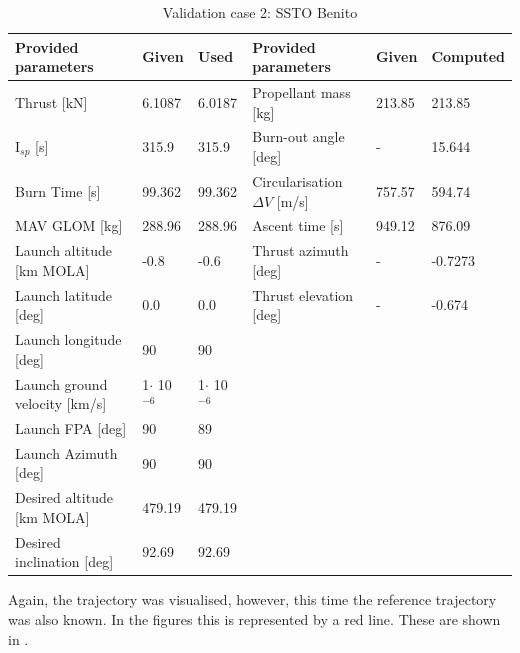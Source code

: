 \begin{table}[H]
\begin{center}
\caption{Validation case 2: \ac{SSTO} Benito}
\label{tab:validationCaseBenito}
\begin{tabular}{|l|l|l||l||l|l|}
\hline 
\textbf{Provided parameters} & \textbf{Given} & \textbf{Used} & \textbf{Provided parameters} & \textbf{Given} & \textbf{Computed} \\ \hline \hline
Thrust [kN] & 6.1087 & 6.0187 & Propellant mass [kg] & 213.85 & 213.85 \\ \hline
I$_{sp}$ [s] & 315.9 & 315.9 & Burn-out angle [deg] & - & 15.644 \\ \hline
Burn Time [s] & 99.362 & 99.362 & Circularisation $\Delta V$ [m/s] & 757.57 & 594.74 \\ \hline
\ac{MAV} \ac{GLOM} [kg] & 288.96 & 288.96 & Ascent time [s] & 949.12 & 876.09 \\ \hline
Launch altitude [km \ac{MOLA}] & -0.8 & -0.6 & Thrust azimuth [deg] & - & -0.7273 \\ \hline
Launch latitude [deg] & 0.0 & 0.0 & Thrust elevation [deg] & - & -0.674 \\ \hline
Launch longitude [deg] & 90 & 90 & & & \\ \hline
Launch ground velocity [km/s] & 1$\cdot $ 10$^{-6}$ & 1$\cdot $ 10$^{-6}$ & & & \\ \hline
Launch \ac{FPA} [deg] & 90 & 89 & & & \\ \hline
Launch Azimuth [deg] & 90 & 90 & & & \\ \hline
Desired altitude [km \ac{MOLA}] & 479.19 & 479.19 & & & \\ \hline
Desired inclination [deg] & 92.69 & 92.69 & & & \\ \hline




\end{tabular}
\end{center}
\end{table}

\noindent
Again, the trajectory was visualised, however, this time the reference trajectory was also known. In the figures this is represented by a red line. These are shown in .




